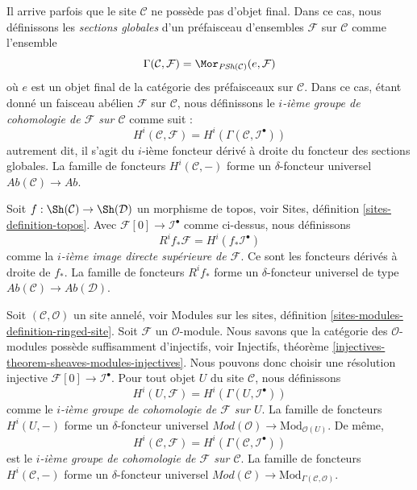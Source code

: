\medskip\noindent
Il arrive parfois que
le site $\mathcal{C}$ ne possède pas d'objet final. Dans ce
cas, nous définissons les {\it sections globales} d'un préfaisceau
d'ensembles $\mathcal{F}$ sur $\mathcal{C}$ comme l'ensemble
\begin{equation}
\label{equation-global-sections}
\Gamma(\mathcal{C}, \mathcal{F}) =
\Mor_{\textit{PSh}(\mathcal{C})}(e, \mathcal{F})
\end{equation}
où $e$ est un objet final de la catégorie des préfaisceaux sur $\mathcal{C}$.
Dans ce cas, étant donné un faisceau abélien $\mathcal{F}$ sur $\mathcal{C}$,
nous définissons le {\it $i$-ième groupe de cohomologie de $\mathcal{F}$ sur $\mathcal{C}$}
comme suit :
\begin{equation}
\label{equation-cohomology}
H^i(\mathcal{C}, \mathcal{F}) = H^i(\Gamma(\mathcal{C}, \mathcal{I}^\bullet))
\end{equation}
autrement dit, il s'agit du $i$-ième foncteur dérivé à droite du
foncteur des sections globales.
La famille de foncteurs $H^i(\mathcal{C}, -)$ forme un $\delta$-foncteur universel
$\textit{Ab}(\mathcal{C}) \to \textit{Ab}$.

\medskip\noindent
Soit $f : \Sh(\mathcal{C}) \to \Sh(\mathcal{D})$ un morphisme de topos, voir
Sites, définition \ref{sites-definition-topos}.
Avec $\mathcal{F}[0] \to \mathcal{I}^\bullet$ comme ci-dessus,
nous définissons
\begin{equation}
\label{equation-higher-direct-image}
R^if_*\mathcal{F} = H^i(f_*\mathcal{I}^\bullet)
\end{equation}
comme la {\it $i$-ième image directe supérieure de $\mathcal{F}$}.
Ce sont les foncteurs dérivés à droite de $f_*$.
La famille de foncteurs $R^if_*$ forme un $\delta$-foncteur universel
de type $\textit{Ab}(\mathcal{C}) \to \textit{Ab}(\mathcal{D})$.

\medskip\noindent
Soit $(\mathcal{C}, \mathcal{O})$ un site annelé, voir
Modules sur les sites, définition \ref{sites-modules-definition-ringed-site}.
Soit $\mathcal{F}$ un $\mathcal{O}$-module.
Nous savons que la catégorie des $\mathcal{O}$-modules
possède suffisamment d'injectifs, voir
Injectifs, théorème \ref{injectives-theorem-sheaves-modules-injectives}.
Nous pouvons donc choisir une résolution injective
$\mathcal{F}[0] \to \mathcal{I}^\bullet$.
Pour tout objet $U$ du site $\mathcal{C}$, nous définissons
\begin{equation}
\label{equation-cohomology-object-site-modules}
H^i(U, \mathcal{F}) = H^i(\Gamma(U, \mathcal{I}^\bullet))
\end{equation}
comme le {\it $i$-ième groupe de cohomologie de $\mathcal{F}$ sur $U$}.
La famille de foncteurs $H^i(U, -)$ forme un $\delta$-foncteur universel
$\textit{Mod}(\mathcal{O}) \to \text{Mod}_{\mathcal{O}(U)}$. De même,
\begin{equation}
\label{equation-cohomology-modules}
H^i(\mathcal{C}, \mathcal{F}) = H^i(\Gamma(\mathcal{C}, \mathcal{I}^\bullet))
\end{equation}
est le {\it $i$-ième groupe de cohomologie de $\mathcal{F}$ sur $\mathcal{C}$}.
La famille de foncteurs $H^i(\mathcal{C}, -)$ forme un
$\delta$-foncteur universel
$\textit{Mod}(\mathcal{C}) \to \text{Mod}_{\Gamma(\mathcal{C}, \mathcal{O})}$.

